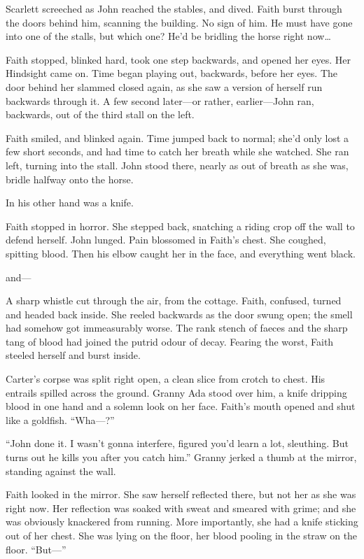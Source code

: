 Scarlett screeched as John reached the stables, and dived.
Faith burst through the doors behind him, scanning the building.
No sign of him.
He must have gone into one of the stalls, but which one?
He'd be bridling the horse right now{\dots}

Faith stopped, blinked hard, took one step backwards, and opened her eyes.
Her Hindsight came on.
Time began playing out, backwards, before her eyes.
The door behind her slammed closed again, as she saw a version of herself run backwards through it.
A few second later---or rather, earlier---John ran, backwards, out of the third stall on the left.

Faith smiled, and blinked again.
Time jumped back to normal; she'd only lost a few short seconds, and had time to catch her breath while she watched.
She ran left, turning into the stall.
John stood there, nearly as out of breath as she was, bridle halfway onto the horse.

In his other hand was a knife.

Faith stopped in horror.
She stepped back, snatching a riding crop off the wall to defend herself.
John lunged.
Pain blossomed in Faith's chest.
She coughed, spitting blood.
Then his elbow caught her in the face, and everything went black.

\storybreak

{\foretellingstoryrepeat}
and---

A sharp whistle cut through the air, from the cottage.
Faith, confused, turned and headed back inside.
She reeled backwards as the door swung open; the smell had somehow got immeasurably worse.
The rank stench of faeces and the sharp tang of blood had joined the putrid odour of decay.
Fearing the worst, Faith steeled herself and burst inside.

Carter's corpse was split right open, a clean slice from crotch to chest.
His entrails spilled across the ground.
Granny Ada stood over him, a knife dripping blood in one hand and a solemn look on her face.
Faith's mouth opened and shut like a goldfish.
``Wha---?''

``John done it.
I wasn't gonna interfere, figured you'd learn a lot, sleuthing.
But turns out he kills you after you catch him.''
Granny jerked a thumb at the mirror, standing against the wall.

Faith looked in the mirror.
She saw herself reflected there, but not her as she was right now.
Her reflection was soaked with sweat and smeared with grime; and she was obviously knackered from running.
More importantly, she had a knife sticking out of her chest.
She was lying on the floor, her blood pooling in the straw on the floor.
``But---''

